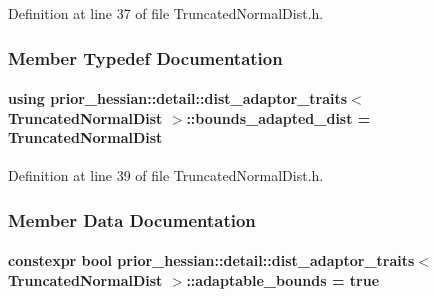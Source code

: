 Definition at line 37 of file Truncated\+Normal\+Dist.\+h.



\subsubsection{Member Typedef Documentation}
\paragraph[{\texorpdfstring{bounds\+\_\+adapted\+\_\+dist}{bounds_adapted_dist}}]{\setlength{\rightskip}{0pt plus 5cm}using {\bf prior\+\_\+hessian\+::detail\+::dist\+\_\+adaptor\+\_\+traits}$<$ {\bf Truncated\+Normal\+Dist} $>$\+::{\bf bounds\+\_\+adapted\+\_\+dist} =  {\bf Truncated\+Normal\+Dist}}\hypertarget{structprior__hessian_1_1detail_1_1dist__adaptor__traits_3_01TruncatedNormalDist_01_4_a783f4b07a970a4883b389f31b3bde27b}{}\label{structprior__hessian_1_1detail_1_1dist__adaptor__traits_3_01TruncatedNormalDist_01_4_a783f4b07a970a4883b389f31b3bde27b}


Definition at line 39 of file Truncated\+Normal\+Dist.\+h.



\subsubsection{Member Data Documentation}
\paragraph[{\texorpdfstring{adaptable\+\_\+bounds}{adaptable_bounds}}]{\setlength{\rightskip}{0pt plus 5cm}constexpr bool {\bf prior\+\_\+hessian\+::detail\+::dist\+\_\+adaptor\+\_\+traits}$<$ {\bf Truncated\+Normal\+Dist} $>$\+::adaptable\+\_\+bounds = true\hspace{0.3cm}{\ttfamily [static]}}\hypertarget{structprior__hessian_1_1detail_1_1dist__adaptor__traits_3_01TruncatedNormalDist_01_4_acaf702d55b85c9e5cc1c70fc99a22498}{}\label{structprior__hessian_1_1detail_1_1dist__adaptor__traits_3_01TruncatedNormalDist_01_4_acaf702d55b85c9e5cc1c70fc99a22498}


